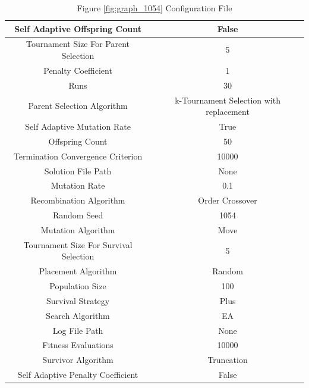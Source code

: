 \documentclass{standalone}
\begin{document}
\begin{table}[!htb]
	\centering
	\caption{Figure \ref{fig:graph_1054} Configuration File}
	\label{tab:graph_1054}
	\begin{tabular}{| c | c |}
		\hline
		Self Adaptive Offspring Count		& False		 \\
		\hline
		Tournament Size For Parent Selection		& 5		 \\
		\hline
		Penalty Coefficient		& 1		 \\
		\hline
		Runs		& 30		 \\
		\hline
		Parent Selection Algorithm		& k-Tournament Selection with replacement		 \\
		\hline
		Self Adaptive Mutation Rate		& True		 \\
		\hline
		Offspring Count		& 50		 \\
		\hline
		Termination Convergence Criterion		& 10000		 \\
		\hline
		Solution File Path		& None		 \\
		\hline
		Mutation Rate		& 0.1		 \\
		\hline
		Recombination Algorithm		& Order Crossover		 \\
		\hline
		Random Seed		& 1054		 \\
		\hline
		Mutation Algorithm		& Move		 \\
		\hline
		Tournament Size For Survival Selection		& 5		 \\
		\hline
		Placement Algorithm		& Random		 \\
		\hline
		Population Size		& 100		 \\
		\hline
		Survival Strategy		& Plus		 \\
		\hline
		Search Algorithm		& EA		 \\
		\hline
		Log File Path		& None		 \\
		\hline
		Fitness Evaluations		& 10000		 \\
		\hline
		Survivor Algorithm		& Truncation		 \\
		\hline
		Self Adaptive Penalty Coefficient		& False		 \\
		\hline
	\end{tabular}
\end{table}
\end{document}
